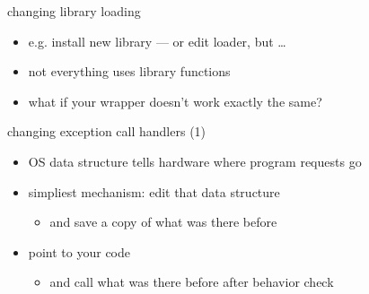 
\begin{frame}{changing library loading}
\begin{itemize}
    \item e.g. install new library --- or edit loader, but \ldots
    \vspace{.5cm}
    \item not everything uses library functions
    \item what if your wrapper doesn't work exactly the same?
\end{itemize}
\end{frame}


\begin{frame}{changing exception call handlers (1)}
    \begin{itemize}
    \item OS data structure tells hardware where program requests go
    \item simpliest mechanism: edit that data structure
       \begin{itemize}
       \item and save a copy of what was there before
       \end{itemize}
    \item point to your code
        \begin{itemize}
        \item and call what was there before after behavior check
        \end{itemize}
    \end{itemize}
\end{frame}

